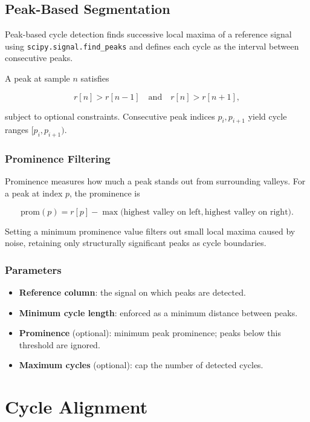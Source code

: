 \documentclass[11pt,a4paper]{article}
\begin{document}
\subsection{Peak-Based Segmentation}

Peak-based cycle detection finds successive local maxima of a reference signal using \texttt{scipy.signal.find\_peaks} and defines each cycle as the interval between consecutive peaks.

A peak at sample $n$ satisfies

\[
r[n] > r[n-1] \quad \text{and} \quad r[n] > r[n+1],
\]

subject to optional constraints. Consecutive peak indices $p_i, p_{i+1}$ yield cycle ranges $[p_i, p_{i+1})$.

\subsubsection{Prominence Filtering}

Prominence measures how much a peak stands out from surrounding valleys. For a peak at index $p$, the prominence is

\[
\mathrm{prom}(p) = r[p] - \max\bigl(\text{highest valley on left}, \text{highest valley on right}\bigr).
\]

Setting a minimum prominence value filters out small local maxima caused by noise, retaining only structurally significant peaks as cycle boundaries.

\subsubsection{Parameters}

\begin{itemize}
    \item \textbf{Reference column}: the signal on which peaks are detected.
    \item \textbf{Minimum cycle length}: enforced as a minimum distance between peaks.
    \item \textbf{Prominence} (optional): minimum peak prominence; peaks below this threshold are ignored.
    \item \textbf{Maximum cycles} (optional): cap the number of detected cycles.
\end{itemize}

\section{Cycle Alignment}
\end{document}
